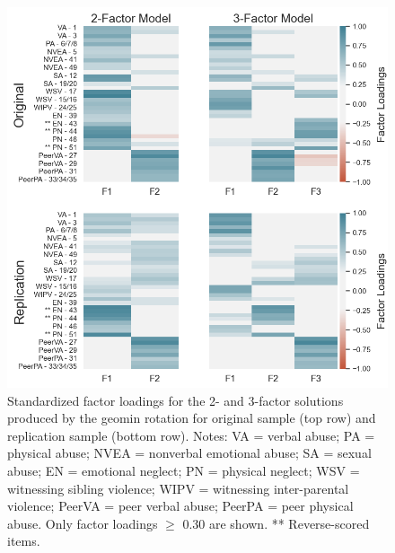 \documentclass[letterpaper,man,natbib,noextraspace,floatsintext,longtable,12pt]{apa6}
\begin{document}
\begin{figure}[H]
    \centering
    \includegraphics[width=1\textwidth,center]{figures/figS05.png}
    \caption{\normalfont Standardized factor loadings for the 2- and 3-factor solutions produced by the geomin rotation for original sample (top row) and replication sample (bottom row). Notes: VA = verbal abuse; PA = physical abuse; NVEA = nonverbal emotional abuse; SA = sexual abuse; EN = emotional neglect; PN = physical neglect; WSV = witnessing sibling violence; WIPV = witnessing inter-parental violence; PeerVA = peer verbal abuse; PeerPA = peer physical abuse. Only factor loadings $\geq$ 0.30 are shown. ** Reverse-scored items.}
    \label{fig:efa_geomin}
\end{figure}

\end{document}
